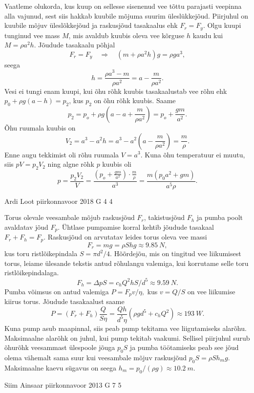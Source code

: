 \documentclass[11pt]{article}
\begin{document}
{{\ifSolution
Vaatleme olukorda, kus kuup on sellesse sisenenud vee tõttu parajasti veepinna alla vajunud, sest siis hakkab kuubile mõjuma suurim üleslükkejõud. Piirjuhul on kuubile mõjuv üleslõkkejõud ja raskusjõud tasakaalus ehk $F_r = F_y$. Olgu kuupi tunginud vee mass $M$, mis avaldub kuubis oleva vee kõrguse $h$ kaudu kui $M = \rho a^2h$. Jõudude tasakaalu põhjal
\[
F_r = F_y \quad\Rightarrow\quad (m + \rho a^2h)g=\rho ga^3,
\]
seega
\[
h = \frac{\rho a^3 - m}{\rho a^2} = a - \frac{m}{\rho a^2}.
\]
Vesi ei tungi enam kuupi, kui õhu rõhk kuubis tasakaalustab vee rõhu ehk $p_0 + \rho g(a-h) = p_2$, kus $p_2$ on õhu rõhk kuubis. Saame
\[
p_2 = p_o + \rho g\left(a - a + \frac{m}{\rho a^2}\right) = p_o + \frac{gm}{a^2}.
\]
Õhu ruumala kuubis on
\[
V_2 = a^3 - a^2h = a^3 - a^2\left(a - \frac{m}{\rho a^2}\right) = \frac{m}{\rho}.
\]
Enne augu tekkimist oli rõhu ruumala $V=a^3$. Kuna õhu temperatuur ei muutu, siis $pV = p_2V_2$ ning algne rõhk $p$ kuubis oli
\[
p = \frac{p_2V_2}{V} = \frac{ \left( p_o + \frac{gm}{a^2} \right) \cdot \frac{m}{\rho}}{a^3} = \frac{m(p_0a^2 + gm)}{a^5\rho}.
\]
\fi
}

{Ardi Loot} %
{piirkonnavoor} %
{2018} %
{G 4} %
{4} %
{

\ifSolution
\osa Torus olevale veesambale mõjub raskusjõud $F_{r}$, takistusjõud $F_{h}$
ja pumba poolt avaldatav jõud $F_{p}$. Ühtlase pumpamise korral
kehtib jõudude tasakaal $F_{r}+F_{h}=F_{p}$. Raskusjõud on
arvutatav leides torus oleva vee massi
\[
F_{r}=mg=\rho Shg\approx\SI{9.85}{N},
\]
kus toru ristlõikepindala $S=\pi d^{2}/4.$ Hõõrdejõu, mis
on tingitud vee liikumisest torus, leiame ülesande tekstis antud rõhulangu
valemiga, kui korrutame selle toru ristlõikepindalaga.
\[
F_{h}=\Delta pS=c_{h}Q^{2}hS/d^{5}\approx\SI{9.59}{N}.
\]
Pumba võimsus on antud valemiga $P=F_{p}v/\eta,$ kus $v=Q/S$
on vee liikumise kiirus torus. Jõudude tasakaalust saame
\[
P=\left(F_{r}+F_{h}\right)\frac{Q}{S\eta}=\frac{Qh}{d^{5}\eta}\left(\rho gd^{5}+c_{h}Q^{2}\right)\approx\SI{193}{W}.
\]
\osa Kuna pump asub maapinnal, siis peab pump tekitama vee liigutamiseks
alarõhu. Maksimaalne alarõhk on juhul, kui pump tekitab vaakumi.
Sellisel piirjuhul surub õhurõhk veesammast ülespoole jõuga $p_{0}S$
ja pumba töötamiseks peab see jõud olema vähemalt sama suur kui veesambale
mõjuv raskusjõud $p_{0}S=\rho Sh_{m}g.$ Maksimaalne kaevu sügavus
on seega $h_{m}=p_{0}/\left(\rho g\right)\approx\SI{10.2}{m}$.
\fi
}

{Siim Ainsaar} %
{piirkonnavoor} %
{2013} %
{G 7} %
{5} %
{

}}
\end{document}
